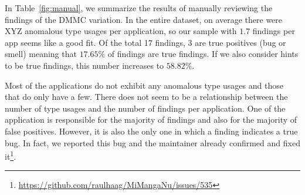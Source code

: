 \begin{table}[t]
    \centering
    \caption{The results of the manual evaluation}\label{fig:manual}
\end{table}

In Table~\ref{fig:manual}, we summarize the results of manually reviewing the findings of the $\text{DMMC}$ variation.
In the entire dataset, on average there were XYZ anomalous type usages per application, so our sample with $1.7$ findings per app seems like a good fit.
Of the total 17 findings, 3 are true positives (bug or smell) meaning that $17.65\%$ of findings are true findings.
If we also consider hints to be true findings, this number increases to $58.82\%$.

Most of the applications do not exhibit any anomalous type usages and those that do only have a few.
There does not seem to be a relationship between the number of type usages and the number of findings per application.
One of the application is responsible for the majority of findings and also for the majority of false positives.
However, it is also the only one in which a finding indicates a true bug.
In fact, we reported this bug and the maintainer already confirmed and fixed it\footnote{\url{https://github.com/raulhaag/MiMangaNu/issues/535}}.

